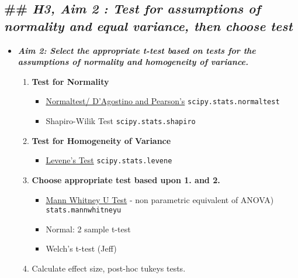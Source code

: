 \documentclass[11pt]{article}
\providecommand{\tightlist}{%
      \setlength{\itemsep}{0pt}\setlength{\parskip}{0pt}}
\begin{document}
    
    \hypertarget{h3-aim-2-test-for-assumptions-of-normality-and-equal-variance-then-choose-test}{%
\subsection{\texorpdfstring{\#\# \textbf{\emph{H3, Aim 2 : Test for
assumptions of normality and equal variance, then choose
test}}}{\#\# H3, Aim 2 : Test for assumptions of normality and equal variance, then choose test}}\label{h3-aim-2-test-for-assumptions-of-normality-and-equal-variance-then-choose-test}}

    \begin{itemize}
\tightlist
\item
  \textbf{\emph{Aim 2: Select the appropriate t-test based on tests for
  the assumptions of normality and homogeneity of variance.}}

  \begin{enumerate}
  \def\labelenumi{\arabic{enumi}.}
  \tightlist
  \item
    \textbf{Test for Normality}

    \begin{itemize}
    \tightlist
    \item
      \href{https://docs.scipy.org/doc/scipy/reference/generated/scipy.stats.normaltest.html}{Normaltest/
      D'Agostino and Pearson's} \texttt{scipy.stats.normaltest}
    \item
      Shapiro-Wilik Test \texttt{scipy.stats.shapiro}
    \end{itemize}
  \item
    \textbf{Test for Homogeneity of Variance}

    \begin{itemize}
    \tightlist
    \item
      \href{https://docs.scipy.org/doc/scipy-0.14.0/reference/generated/scipy.stats.levene.html}{Levene's
      Test} \texttt{scipy.stats.levene}
    \end{itemize}
  \item
    \textbf{Choose appropriate test based upon 1. and 2.}

    \begin{itemize}
    \tightlist
    \item
      \href{https://docs.scipy.org/doc/scipy/reference/generated/scipy.stats.mannwhitneyu.html}{Mann
      Whitney U Test} - non parametric equivalent of ANOVA)
      \texttt{stats.mannwhitneyu}
    \item
      Normal: 2 sample t-test
    \item
      Welch's t-test (Jeff)
    \end{itemize}
  \item
    Calculate effect size, post-hoc tukeys tests.


\end{enumerate}
\end{itemize}
\end{document}
